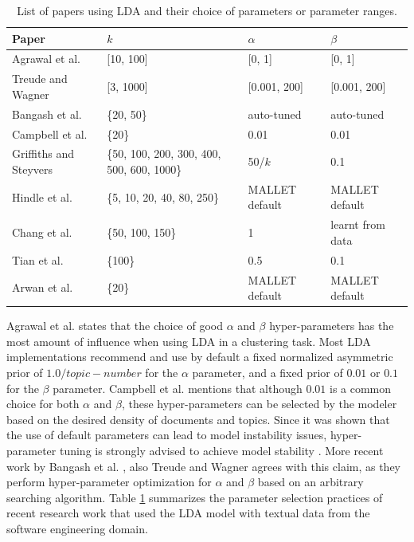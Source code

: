             \begin{table}
              \centering
              \caption{List of papers using LDA and their choice of parameters or parameter ranges.}\label{tab:LDA_params}
                \vspace{6pt} %
              \begin{tabular}{p{4.4 cm} p{3.6 cm} p{2.0cm} p{3.0cm}}
                \hline
                Paper & $k$ & $\alpha$ & $\beta$ \\
                \hline\hline
                Agrawal et al. \cite{agrawal2018wrong} & [10, 100] & [0, 1] & [0, 1] \\
                Treude and Wagner \cite{treude2019predicting} & [3, 1000] & [0.001, 200] & [0.001, 200] \\
                Bangash et al. \cite{bangash2019developers} & \{20, 50\} & auto-tuned & auto-tuned \\
                Campbell et al. \cite{campbell2015latent} & \{20\} & 0.01 & 0.01 \\
                Griffiths and Steyvers \cite{griffiths2004finding} & \{50, 100, 200, 300, 400, 500, 600, 1000\} & 50/$k$ & 0.1 \\
                Hindle et al. \cite{hindle2012relating} & \{5, 10, 20, 40, 80, 250\} & MALLET default & MALLET default \\
                Chang et al. \cite{chang2009reading} & \{50, 100, 150\} & 1 & learnt from data \\
                Tian et al. \cite{tian2013predicting} & \{100\} & 0.5 & 0.1 \\
                Arwan et al. \cite{arwan2015source} & \{20\} & MALLET default & MALLET default \\
                \hline
              \end{tabular}
            \end{table}
            
            Agrawal et al. \cite{agrawal2018wrong} states that the choice of good $\alpha$ and $\beta$ hyper-parameters has the most amount of influence when using LDA in a clustering task. Most LDA implementations recommend and use by default a fixed normalized asymmetric prior of $1.0 / topic-number$ for the $\alpha$ parameter, and a fixed prior of $0.01$ or $0.1$ for the $\beta$ parameter. Campbell et al. \cite{campbell2015latent} mentions that although $0.01$ is a common choice for both $\alpha$ and $\beta$, these hyper-parameters can be selected by the modeler based on the desired density of documents and topics. Since it was shown that the use of default parameters can lead to model instability issues, hyper-parameter tuning is strongly advised to achieve model stability \cite{agrawal2018wrong}. More recent work by Bangash et al. \cite{bangash2019developers}, also Treude and Wagner \cite{treude2019predicting} agrees with this claim, as they perform hyper-parameter optimization for $\alpha$ and $\beta$ based on an arbitrary searching algorithm. Table \ref{tab:LDA_params} summarizes the parameter selection practices of recent research work that used the LDA model with textual data from the software engineering domain.
        

